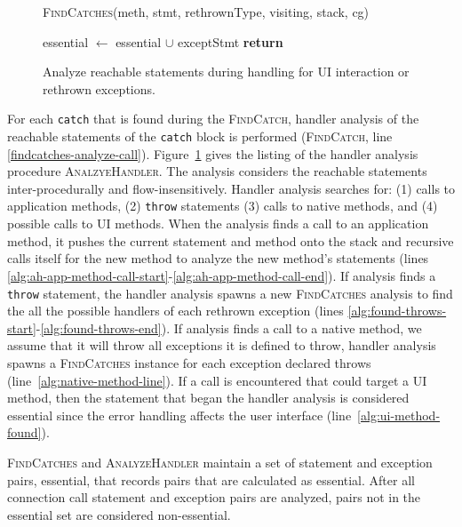 \begin{figure}[t]
\begin{algorithmic}[1]
\EndFor \label{alg:calc-rethrow-types-end}

\label{alg:findcatches-rethrown-line}
\State \textsc{FindCatches}(meth, stmt, rethrownType, visiting, stack,
cg)

\label{alg:progagate-line}
\State essential $\gets$ essential $\cup$ exceptStmt
\State \textbf{return}
\EndIf
\EndFor
\label{alg:found-throws-end}
\EndIf

\EndFor

\EndProcedure
\end{algorithmic}
\caption{Analyze reachable statements during handling for UI
  interaction or rethrown exceptions.}\label{alg:analyzehandler}
\end{figure}

For each \lstinline!catch! that is found during the
\textsc{FindCatch}, handler analysis of the reachable statements of
the \lstinline!catch! block is performed (\textsc{FindCatch}, line
\ref{findcatches-analyze-call}).  Figure~\ref{alg:analyzehandler}
gives the listing of the handler analysis procedure
\textsc{AnalzyeHandler}. The analysis considers the reachable
statements inter-procedurally and flow-insensitively.  Handler
analysis searches for: (1) calls to application methods, (2)
\lstinline!throw! statements (3) calls to native methods, and (4)
possible calls to UI methods. When the analysis finds a call to an
application method, it pushes the current statement and method onto
the stack and recursive calls itself for the new method to analyze the
new method's statements (lines
\ref{alg:ah-app-method-call-start}-\ref{alg:ah-app-method-call-end}).
If analysis finds a \lstinline!throw!  statement, the handler analysis
spawns a new \textsc{FindCatches} analysis to find the all the
possible handlers of each rethrown exception (lines
\ref{alg:found-throws-start}-\ref{alg:found-throws-end}).  If analysis
finds a call to a native method, we assume that it will throw all
exceptions it is defined to throw, handler analysis spawns a
\textsc{FindCatches} instance for each exception declared throws
(line~\ref{alg:native-method-line}).  If a call is encountered that
could target a UI method, then the statement that began the handler
analysis is considered essential since the error handling affects the
user interface (line~\ref{alg:ui-method-found}).

\textsc{FindCatches} and \textsc{AnalyzeHandler} maintain a set of
statement and exception pairs, essential, that records pairs that are
calculated as essential.  After all connection call statement and
exception pairs are analyzed, pairs not in the essential set are
considered non-essential.

